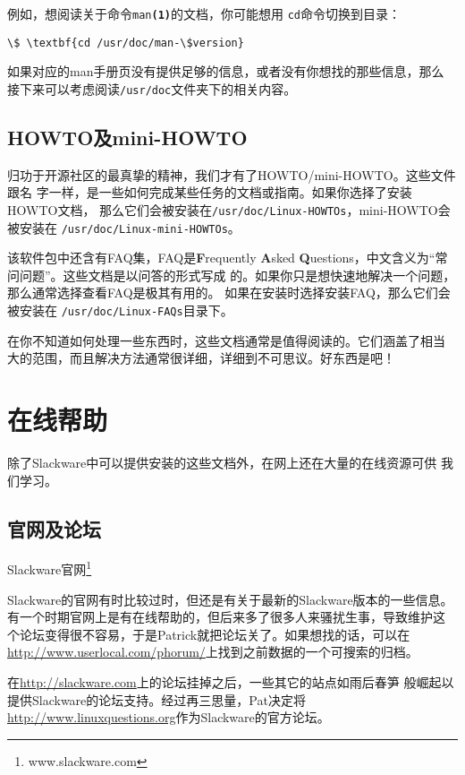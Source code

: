 例如，想阅读关于命令\texttt{man\textbf{(1)}}的文档，你可能想用
\texttt{cd}命令切换到目录：
\begin{Verbatim}[frame=single, commandchars=\\\{\}]
\$ \textbf{cd /usr/doc/man-\$version}
\end{Verbatim}
如果对应的man手册页没有提供足够的信息，或者没有你想找的那些信息，那么
接下来可以考虑阅读\texttt{/usr/doc}文件夹下的相关内容。

\subsection{HOWTO及mini-HOWTO}
\label{sec:help:systemHelp:howto}

归功于开源社区的最真挚的精神，我们才有了HOWTO/mini-HOWTO。这些文件跟名
字一样，是一些如何完成某些任务的文档或指南。如果你选择了安装HOWTO文档，
那么它们会被安装在\texttt{/usr/doc/Linux-HOWTOs}，mini-HOWTO会被安装在
\texttt{/usr/doc/Linux-mini-HOWTOs}。

该软件包中还含有FAQ集，FAQ是\textbf{F}requently \textbf{A}sked
\textbf{Q}uestions，中文含义为``常问问题''。这些文档是以问答的形式写成
的。如果你只是想快速地解决一个问题，那么通常选择查看FAQ是极其有用的。
如果在安装时选择安装FAQ，那么它们会被安装在
\texttt{/usr/doc/Linux-FAQs}目录下。

在你不知道如何处理一些东西时，这些文档通常是值得阅读的。它们涵盖了相当
大的范围，而且解决方法通常很详细，详细到不可思议。好东西是吧！

\section{在线帮助}
\label{sec:help:onlineHelp}

除了Slackware中可以提供安装的这些文档外，在网上还在大量的在线资源可供
我们学习。

\subsection{官网及论坛}
\label{sec:help:onlineHelp:website}
Slackware官网\footnote{www.slackware.com}

Slackware的官网有时比较过时，但还是有关于最新的Slackware版本的一些信息。
有一个时期官网上是有在线帮助的，但后来多了很多人来骚扰生事，导致维护这
个论坛变得很不容易，于是Patrick就把论坛关了。如果想找的话，可以在
\url{http://www.userlocal.com/phorum/}上找到之前数据的一个可搜索的归档。

在\url{http://slackware.com}上的论坛挂掉之后，一些其它的站点如雨后春笋
般崛起以提供Slackware的论坛支持。经过再三思量，Pat决定将
\url{http://www.linuxquestions.org}作为Slackware的官方论坛。

